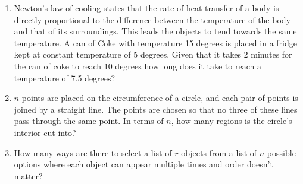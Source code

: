 \documentclass{article}
\begin{document}
\begin{enumerate}
    \item
    Newton's law of cooling states that the rate of heat transfer of a body is directly proportional to the difference between the temperature of the body and that of its surroundings. This leads the objects to tend towards the same temperature. A can of Coke with temperature 15 degrees is placed in a fridge kept at constant temperature of 5 degrees. Given that it takes 2 minutes for the can of coke to reach 10 degrees how long does it take to reach a temperature of 7.5 degrees?
    
    \item
    $n$ points are placed on the circumference of a circle, and each pair of points is joined by a straight line. The points are chosen so that no three of these lines pass through the same point. In terms of $n$, how many regions is the circle's interior cut into?
    
    \item
    How many ways are there to select a list of $r$ objects from a list of $n$ possible options where each object can appear multiple times and order doesn't matter?

    
    
    
    
    
    
\end{enumerate}
\end{document}
